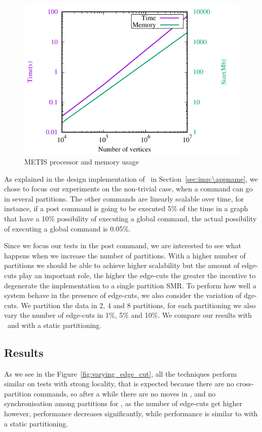 \begin{figure}[ht!]
  \centering
    \includegraphics[width=0.8\columnwidth]{figures/metis_size_time}
	\caption{METIS processor and memory usage}
	\label{fig:metis_size_time}
\end{figure}

As explained in the design implementation of \appname\ in Section~\ref{sec:imp:\appname}, we chose to focus our
experiments on the non-trivial case, when a command can go in several partitions. The other commands are linearly
scalable over time, for instance, if a post command is going to be executed 5\% of the time in a graph that have a 10\%
possibility of executing a global command, the actual possibility of executing a global command is 0.05\%.

Since we focus our tests in the post command, we are interested to see what happens when we increase the number of
partitions. With a higher number of partitions we should be able to achieve higher scalability but the amount of edge-cuts
play an important role, the higher the edge-cuts the greater the incentive to degenerate the implementation to a single
partition SMR. To perform how well a system behave in the presence of edge-cuts, we also consider the variation of
dge-cuts. We partition the data in 2, 4 and 8 partitions, for each partitioning we also vary the number of edge-cuts 
in 1\%, 5\% and 10\%. We compare our results with \dssmr\ and \ssmr with a static partitioning.

\subsection{Results}
As we see in the Figure~\ref{fig:varying_edge_cut}, all the techniques perform similar on tests with strong locality, that is
expected because there are no cross-partition commands, so after a while there are no moves in \dynastar, and no
synchronisation among partitions for \ssmr, as the number of edge-cuts get higher however, \dssmr performance 
decreases significantly, while \dynastar performance is similar to \ssmr with a static partitioning.

